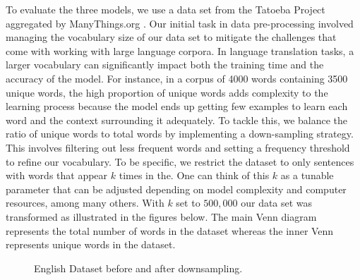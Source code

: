 \documentclass{article}
\begin{document}
To evaluate the three models, we use a data set from the Tatoeba Project aggregated by ManyThings.org \cite{manythings.org}. Our initial task in data pre-processing involved managing the vocabulary size of our data set to mitigate the challenges that come with working with large language corpora. In language 
translation tasks, a larger vocabulary can significantly impact both the training time and the accuracy of the model. For instance, in a corpus of 4000 words containing 3500 unique words, the high proportion of unique words adds complexity to the learning process because the model ends up getting few examples to learn each word and the context surrounding it adequately. To tackle this, we balance the ratio of unique words to total words by implementing a down-sampling strategy. This involves filtering out less frequent words and setting a frequency threshold to refine our vocabulary. To be specific, we restrict the dataset to only sentences with words that appear $k$ times in the. One can think of this $k$ as a tunable parameter that can be adjusted depending on model complexity and computer resources, among many others. With $k$ set to $500, 000$ our data set was transformed as illustrated in the figures below. The main Venn diagram represents the total number of words in the dataset whereas the inner Venn represents unique words in the dataset.

\begin{figure}[ht]
      \caption{English Dataset before and after downsampling.}
\end{figure}
\end{document}
